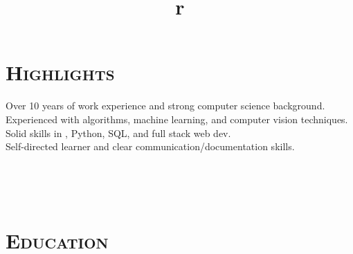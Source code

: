 \begin{resume}

\vspace{-0.2in}


\section{\textsc{Highlights}}

Over 10 years of work experience and strong computer science background.\vspace{0.4em}\\
Experienced with algorithms, machine learning, and computer vision techniques.\vspace{0.4em}\\
Solid skills in \Cplusplus, Python, SQL, and full stack web dev.\vspace{0.4em}\\
Self-directed learner and clear communication/documentation skills.





\begin{formatb}
  \\
  \title{r}\\
\end{formatb}

\section{\textsc{Education}}


\end{resume}
